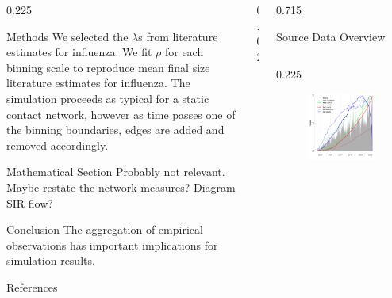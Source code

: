 \documentclass[final]{beamer} %
\newcommand{\spaceProp}{0.02}
\newcommand{\spacer}{\begin{column}{\spaceProp\paperwidth}\end{column}}
\newenvironment{oneCol}{\begin{column}[t]{0.225\paperwidth}}{\end{column}}
\newenvironment{threeCol}{\begin{column}[t]{0.715\paperwidth}}{\end{column}}
\begin{document}
\begin{frame}{}
\begin{columns}[t]
\begin{oneCol}
\begin{block}{Methods}
We selected the $\lambda$s from literature estimates for influenza.  We fit $\rho$ for each binning scale to reproduce mean final size literature estimates for influenza.  The simulation proceeds as typical for a static contact network, however as time passes one of the binning boundaries, edges are added and removed accordingly.
    \end{block}
    \begin{block}{Mathematical Section}
Probably not relevant.  Maybe restate the network measures?  Diagram SIR flow?
    \end{block}
    \begin{block}{Conclusion}
The aggregation of empirical observations has important implications for simulation results.
    \end{block}
    \begin{block}{References}
      \nocite{*} %
      \small{
      \vspace{0.75in}}
    \end{block}
    \end{oneCol}
    \spacer{}
    \begin{threeCol}
    \begin{block}{Source Data Overview}
    \begin{columns}
    \begin{oneCol}
      \begin{figure}
        \includegraphics[width=1.0\linewidth]{dataReview.png}

\end{figure}
\end{oneCol}
\end{columns}
\end{block}
\end{threeCol}
\end{columns}
\end{frame}
\end{document}
